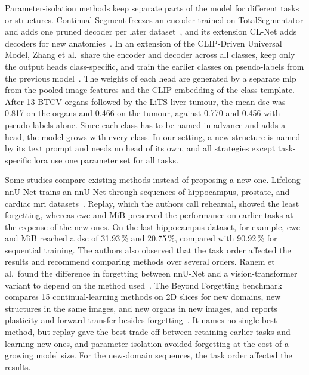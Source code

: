 Parameter-isolation methods keep separate parts of the model for different tasks or structures.
Continual Segment freezes an encoder trained on TotalSegmentator and adds one pruned decoder per later dataset~\cite{ji2023continualsegmentsingleunified}, and its extension CL-Net adds decoders for new anatomies~\cite{guo2025continuallearningdrivenmodelaccurate}.
In an extension of the CLIP-Driven Universal Model, Zhang et al.\ share the encoder and decoder across all classes, keep only the output heads class-specific, and train the earlier classes on pseudo-labels from the previous model~\cite{zhang2023continuallearningabdominalmultiorgan}.
The weights of each head are generated by a separate \gls{mlp} from the pooled image features and the CLIP embedding of the class template.
After 13 BTCV organs followed by the LiTS liver tumour, the mean \gls{dsc} was 0.817 on the organs and 0.466 on the tumour, against 0.770 and 0.456 with pseudo-labels alone.
Since each class has to be named in advance and adds a head, the model grows with every class.
In our setting, a new structure is named by its text prompt and needs no head of its own, and all strategies except task-specific \gls{lora} use one parameter set for all tasks.

Some studies compare existing methods instead of proposing a new one.
Lifelong nnU-Net trains an nnU-Net through sequences of hippocampus, prostate, and cardiac \gls{mri} datasets~\cite{gonzalez2023lifelong}.
Replay, which the authors call rehearsal, showed the least forgetting, whereas \gls{ewc} and MiB preserved the performance on earlier tasks at the expense of the new ones.
On the last hippocampus dataset, for example, \gls{ewc} and MiB reached a \gls{dsc} of 31.93\,\% and 20.75\,\%, compared with 90.92\,\% for sequential training.
The authors also observed that the task order affected the results and recommend comparing methods over several orders.
Ranem et al.\ found the difference in forgetting between nnU-Net and a vision-transformer variant to depend on the method used~\cite{ranem2022continualhippocampussegmentationtransformers}.
The Beyond Forgetting benchmark compares 15 continual-learning methods on 2D slices for new domains, new structures in the same images, and new organs in new images, and reports plasticity and forward transfer besides forgetting~\cite{wang2026beyondforgetting}.
It names no single best method, but replay gave the best trade-off between retaining earlier tasks and learning new ones, and parameter isolation avoided forgetting at the cost of a growing model size.
For the new-domain sequences, the task order affected the results.

